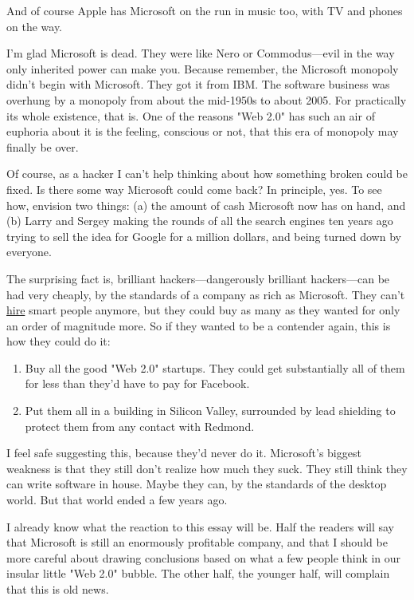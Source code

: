 And of course Apple has Microsoft on the run in music
too, with TV and phones on the way.

I'm glad Microsoft is dead.  They were like Nero or 
Commodus---evil
in the way only inherited power can make you.  Because remember,
the Microsoft monopoly didn't begin with Microsoft.  They got it
from IBM.  The software business was overhung by a
monopoly from about the mid-1950s to about 2005.  For practically
its whole existence, that is.  One of the reasons "Web 2.0" has
such an air of euphoria about it is the feeling, conscious or not,
that this era of monopoly may finally be over.

Of course, as a hacker I can't help thinking about how something
broken could be fixed.  Is there some way Microsoft could come back?
In principle, yes.  To see how, envision two things: (a) the amount
of cash Microsoft now has on hand, and (b) Larry and Sergey making
the rounds of all the search engines ten years ago trying to sell
the idea for Google for a million dollars, and being turned down
by everyone.

The surprising fact is, brilliant hackers---dangerously brilliant
hackers---can be had very cheaply, by the standards of a
company as rich as Microsoft.  They can't 
\href{http://www.paulgraham.com/hiring.html}{hire} smart people anymore,
but they could buy as many as they wanted for only an order of magnitude 
more. So if they wanted to be a contender
again, this is how they could do it:
\begin{enumerate}
\item  Buy all the good "Web 2.0" startups.  They could get substantially
    all of them for less than they'd have to pay for Facebook.


\item  Put them all in a building in Silicon Valley, surrounded by
    lead shielding to protect them from any contact with Redmond.

\end{enumerate}

I feel safe suggesting this, because they'd never do it.  Microsoft's
biggest weakness is that they still don't realize how much they
suck.  They still think they can write software in house.  Maybe they
can, by the standards of the desktop world.  But that world ended
a few years ago.

I already know what the reaction to this essay will be.  Half the
readers will say that Microsoft is still an enormously profitable
company, and that I should be more
careful about drawing conclusions based on what a few people think
in our insular little "Web 2.0" bubble.  The other half, the younger
half, will complain that this is old news.





